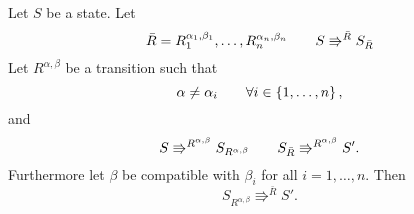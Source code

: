 \begin{lemma} \label{lem:lemma2}
  Let $S$ be a state. Let
  \begin{equation*}
    \bar{R} = R_1^{\alpha_1, \beta_1}, \dots, R_n^{\alpha_n, \beta_n} \quad\quad
    S \Rrightarrow^{\bar{R}} S_{\bar{R}}
  \end{equation*}
  Let $R^{\alpha, \beta}$ be a transition such that
  \begin{equation} \label{eq:lemma2_1}
    \alpha \neq \alpha_i \quad\quad \forall i \in \left\{ 1, \dots, n \right\},
  \end{equation}
  and
  \begin{equation*}
    S \Rrightarrow^{R^{\alpha, \beta}} S_{R^{\alpha, \beta}} \quad\quad
    S_{\bar{R}} \Rrightarrow^{R^{\alpha, \beta}} S'.
  \end{equation*}
  Furthermore let $\beta$ be compatible with $\beta_i$ for all $i = 1, \dots,
  n$.
  Then
  \begin{equation*}
    S_{R^{\alpha, \beta}} \Rrightarrow^{\bar{R}} S'.
  \end{equation*}
\end{lemma}


